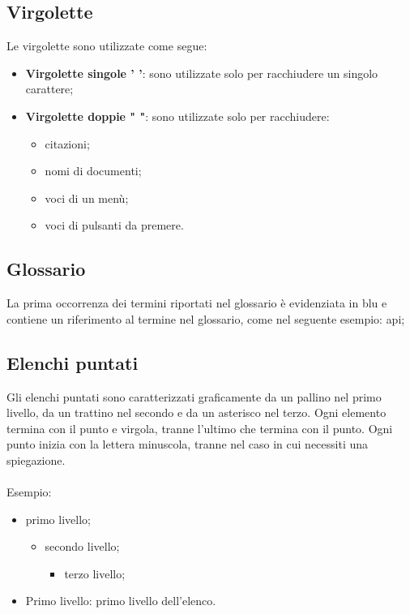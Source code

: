  \subsection{Virgolette}
 Le virgolette sono utilizzate come segue:
 \begin{itemize}
 	\item \textbf{Virgolette singole ' '}: sono utilizzate solo per racchiudere un singolo carattere;
 	\item \textbf{Virgolette doppie " "}: sono utilizzate solo per racchiudere:
 	\begin{itemize}
 		\item citazioni;
 		\item nomi di documenti;
 		\item voci di un menù;
 		\item voci di pulsanti da premere.
 	\end{itemize}
 \end{itemize}

\subsection{Glossario}
La prima occorrenza dei termini riportati nel glossario è evidenziata in blu e contiene un riferimento al termine nel glossario, come nel seguente esempio: \gls{api};


\subsection{Elenchi puntati}
Gli elenchi puntati sono caratterizzati graficamente da un pallino nel primo livello, da un
trattino nel secondo e da un asterisco nel terzo.
Ogni elemento termina con il punto e virgola, tranne l'ultimo che termina con il punto. Ogni punto inizia con la lettera minuscola, tranne nel caso in cui necessiti una spiegazione.
\\
\\Esempio:
\begin{itemize}
	\item primo livello;
		\begin{itemize}
			\item secondo livello;
			\begin{itemize}
				\item terzo livello;
			\end{itemize}
		\end{itemize}
	\item Primo livello: primo livello dell'elenco.
\end{itemize}